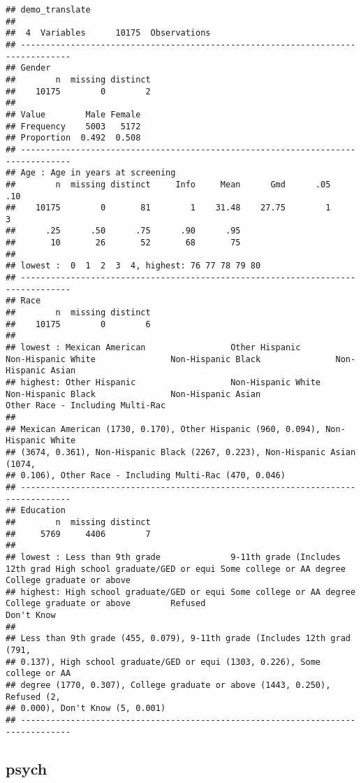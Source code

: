 \documentclass[
]{book}
\begin{document}
\begin{verbatim}
## demo_translate 
## 
##  4  Variables      10175  Observations
## --------------------------------------------------------------------------------
## Gender 
##        n  missing distinct 
##    10175        0        2 
##                         
## Value        Male Female
## Frequency    5003   5172
## Proportion  0.492  0.508
## --------------------------------------------------------------------------------
## Age : Age in years at screening 
##        n  missing distinct     Info     Mean      Gmd      .05      .10 
##    10175        0       81        1    31.48    27.75        1        3 
##      .25      .50      .75      .90      .95 
##       10       26       52       68       75 
## 
## lowest :  0  1  2  3  4, highest: 76 77 78 79 80
## --------------------------------------------------------------------------------
## Race 
##        n  missing distinct 
##    10175        0        6 
## 
## lowest : Mexican American                 Other Hispanic                   Non-Hispanic White               Non-Hispanic Black               Non-Hispanic Asian              
## highest: Other Hispanic                   Non-Hispanic White               Non-Hispanic Black               Non-Hispanic Asian               Other Race - Including Multi-Rac
## 
## Mexican American (1730, 0.170), Other Hispanic (960, 0.094), Non-Hispanic White
## (3674, 0.361), Non-Hispanic Black (2267, 0.223), Non-Hispanic Asian (1074,
## 0.106), Other Race - Including Multi-Rac (470, 0.046)
## --------------------------------------------------------------------------------
## Education 
##        n  missing distinct 
##     5769     4406        7 
## 
## lowest : Less than 9th grade              9-11th grade (Includes 12th grad High school graduate/GED or equi Some college or AA degree        College graduate or above       
## highest: High school graduate/GED or equi Some college or AA degree        College graduate or above        Refused                          Don't Know                      
## 
## Less than 9th grade (455, 0.079), 9-11th grade (Includes 12th grad (791,
## 0.137), High school graduate/GED or equi (1303, 0.226), Some college or AA
## degree (1770, 0.307), College graduate or above (1443, 0.250), Refused (2,
## 0.000), Don't Know (5, 0.001)
## --------------------------------------------------------------------------------
\end{verbatim}

\hypertarget{psych}{%
\subsection{psych}\label{psych}}
\end{document}
